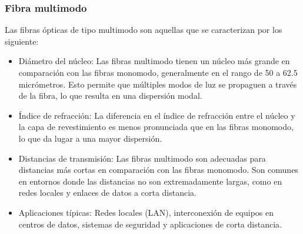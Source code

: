 \documentclass[10.5pt]{article}
\begin{document}
    \subsubsection{Fibra multimodo}
    Las fibras ópticas de tipo multimodo son aquellas que se caracterizan por los siguiente:
    \begin{itemize}
        \item Diámetro del núcleo: Las fibras multimodo tienen un núcleo más grande en comparación con las fibras monomodo, generalmente en el rango de 50 a 62.5 micrómetros. Esto permite que múltiples modos de luz se propaguen a través de la fibra, lo que resulta en una dispersión modal.
        \item Índice de refracción: La diferencia en el índice de refracción entre el núcleo y la capa de revestimiento es menos pronunciada que en las fibras monomodo, lo que da lugar a una mayor dispersión.
        \item Distancias de transmisión: Las fibras multimodo son adecuadas para distancias más cortas en comparación con las fibras monomodo. Son comunes en entornos donde las distancias no son extremadamente largas, como en redes locales y enlaces de datos a corta distancia.
        \item Aplicaciones típicas: Redes locales (LAN), interconexión de equipos en centros de datos, sistemas de seguridad y aplicaciones de corta distancia.
    \end{itemize}
\end{document}
